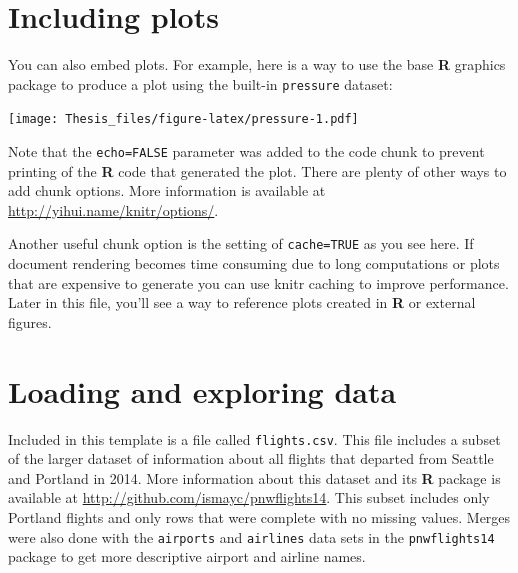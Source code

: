\documentclass[12pt,twoside]{Mactemplate}
\theoremstyle{definition}
\theoremstyle{definition}
\theoremstyle{definition}
\theoremstyle{remark}
\begin{document}
\section{Including plots}\label{including-plots}

You can also embed plots. For example, here is a way to use the base
\textbf{R} graphics package to produce a plot using the built-in
\texttt{pressure} dataset:

\texttt{[image: Thesis\_files/figure-latex/pressure-1.pdf]}

Note that the \texttt{echo=FALSE} parameter was added to the code chunk
to prevent printing of the \textbf{R} code that generated the plot.
There are plenty of other ways to add chunk options. More information is
available at \url{http://yihui.name/knitr/options/}.

Another useful chunk option is the setting of \texttt{cache=TRUE} as you
see here. If document rendering becomes time consuming due to long
computations or plots that are expensive to generate you can use knitr
caching to improve performance. Later in this file, you'll see a way to
reference plots created in \textbf{R} or external figures.

\hypertarget{loading-and-exploring-data}{\section{Loading and exploring
data}\label{loading-and-exploring-data}}

Included in this template is a file called \texttt{flights.csv}. This
file includes a subset of the larger dataset of information about all
flights that departed from Seattle and Portland in 2014. More
information about this dataset and its \textbf{R} package is available
at \url{http://github.com/ismayc/pnwflights14}. This subset includes
only Portland flights and only rows that were complete with no missing
values. Merges were also done with the \texttt{airports} and
\texttt{airlines} data sets in the \texttt{pnwflights14} package to get
more descriptive airport and airline names.
\end{document}
